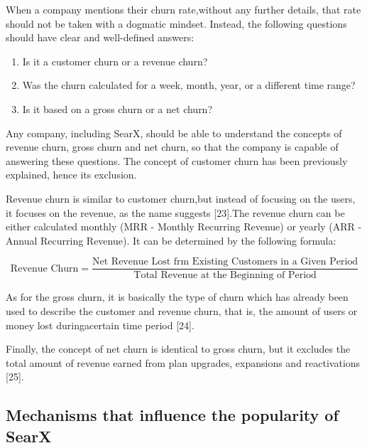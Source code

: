 \documentclass{article}
\begin{document}
When ‌‌a‌‌ company‌‌ mentions‌‌ their‌‌ churn‌‌ rate,‌‌without‌‌ any‌‌ further‌‌ details,‌‌ that‌‌ rate‌‌ should‌‌ not‌‌ be‌‌ taken‌ ‌with‌ ‌a‌ ‌dogmatic‌ ‌mindset.‌ ‌Instead,‌ ‌the‌ ‌following‌ ‌questions‌ ‌should‌ ‌have‌ ‌clear‌ ‌and‌‌ well-defined‌ ‌answers:‌

\begin{enumerate}
    \item Is‌ ‌it‌ ‌a‌ ‌customer‌ ‌churn‌ ‌or‌ ‌a‌ ‌revenue‌ ‌churn?‌‌
    \item Was‌ ‌the‌ ‌churn‌ ‌calculated‌ ‌for‌ ‌a‌ ‌week,‌ ‌month,‌ ‌year,‌ ‌or‌ ‌a‌ ‌different‌ ‌time‌ ‌range?‌
    \item Is‌ ‌it‌ ‌based‌ ‌on‌ ‌a‌ ‌gross‌ ‌churn‌ ‌or‌ ‌a‌ ‌net‌ ‌churn?‌ ‌
\end{enumerate}

Any‌ ‌company,‌ ‌including‌ ‌SearX,‌ ‌should‌ ‌be‌ ‌able‌ ‌to‌ ‌understand‌ ‌the ‌‌concepts ‌‌of ‌‌revenue ‌‌churn,‌‌ gross ‌‌churn‌‌ and‌‌ net ‌‌churn, ‌‌so‌‌ that‌‌ the‌‌ company ‌‌is ‌‌capable ‌‌of‌‌ answering‌‌ these‌‌ questions.‌‌ The‌‌ concept‌ ‌of‌ ‌customer‌ ‌churn‌ ‌has‌ ‌been‌ ‌previously‌ ‌explained,‌ ‌hence‌ ‌its‌ ‌exclusion.

Revenue ‌‌churn‌‌ is ‌‌similar ‌‌to‌‌ customer‌‌ churn,‌‌but ‌‌instead‌‌ of‌‌ focusing‌‌ on ‌‌the‌‌ users,‌‌ it ‌‌focuses‌‌ on‌‌ the‌ ‌revenue,‌ ‌as‌ ‌the‌ ‌name‌ ‌suggests‌ ‌[23‌].‌‌The‌‌ revenue‌‌ churn‌‌ can‌‌ be‌‌ either‌‌ calculated‌‌ monthly‌‌ (MRR‌ ‌-‌ ‌Monthly‌ ‌Recurring‌ ‌Revenue)‌ ‌or‌ ‌yearly‌ ‌(ARR‌ ‌-‌ ‌Annual‌ ‌Recurring‌ ‌Revenue).‌ ‌It‌ ‌can‌‌ be‌‌
determined‌ ‌by‌ ‌the‌ ‌following‌ ‌formula:‌ ‌

\begin{equation}
    \text{Revenue Churn} = \frac{\text{Net Revenue Lost frm Existing Customers in a Given Period}}{\text{Total Revenue at the Beginning of Period}}
    \label{eq:revenuechurn}
\end{equation}

As‌‌ for‌‌ the‌‌ gross‌‌ churn,‌ it‌‌ is‌‌ basically‌‌ the‌‌ type‌‌ of‌‌ churn‌‌ which‌‌ has‌‌ already‌‌ been‌‌ used‌‌ to‌‌ describe‌‌ the‌ ‌customer‌ ‌and‌ ‌revenue‌ ‌churn,‌ ‌that‌ ‌is,‌ ‌the‌ ‌amount‌ ‌of‌ ‌users‌ ‌or‌ ‌money‌ ‌lost‌ ‌during‌‌a‌‌certain‌‌ time‌ ‌period‌ ‌[24].‌

Finally,‌ ‌the‌ ‌concept‌ ‌of‌‌ net‌‌ churn‌‌ is‌‌ identical‌‌ to‌‌ gross‌‌ churn,‌‌ but‌‌ it‌‌ excludes‌‌ the‌‌ total‌‌ amount‌‌ of‌‌ revenue‌ ‌earned‌ ‌from‌ ‌plan‌ ‌upgrades,‌ ‌expansions‌ ‌and‌ ‌reactivations‌ [25]‌.

\subsection{Mechanisms that influence the popularity of SearX}
\end{document}
